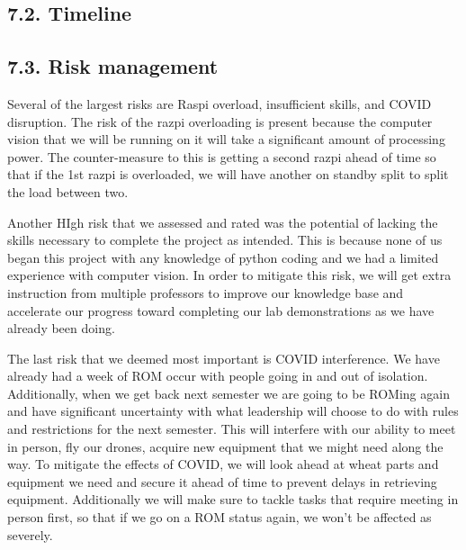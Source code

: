\documentclass[10pt]{article}
\begin{document}
\subsection{7.2. Timeline}
%
%
%
%
%
%
%
%
%

\subsection{7.3. Risk management}
Several of the largest risks are Raspi overload, insufficient skills, and COVID disruption.  The risk of the razpi overloading is present because the computer vision that we will be running on it will take a significant amount of processing power.  The counter-measure to this is getting a second razpi ahead of time so that if the 1st razpi is overloaded, we will have another on standby split to split the load between two.  

Another HIgh risk that we assessed and rated was the potential of lacking the skills necessary to complete the project as intended.  This is because none of us began this project with any knowledge of python coding and we had a limited experience with computer vision.  In order to mitigate this risk, we will get extra instruction from multiple professors to improve our knowledge base and accelerate our progress toward completing our lab demonstrations as we have already been doing. 
 
The last risk that we deemed most important is COVID interference.  We have already had a week of ROM occur with people going in and out of isolation.  Additionally, when we get back next semester we are going to be ROMing again and have significant uncertainty with what leadership will choose to do with rules and restrictions for the next semester.  This will interfere with our ability to meet in person, fly our drones, acquire new equipment that we might need along the way.  To mitigate the effects of COVID, we will look ahead at wheat parts and equipment we need and secure it ahead of time to prevent delays in retrieving equipment.  Additionally we will make sure to tackle tasks that require meeting in person first, so that if we go on a ROM status again, we won't be affected as severely.  
%
%
%
%
%
%
%
%
%
%
%
\end{document}
